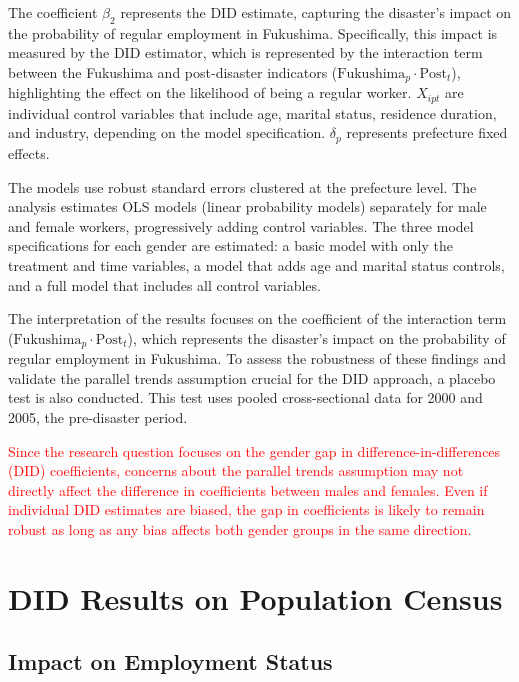 \documentclass[a4paper,12pt]{article}
\begin{document}
The coefficient $\beta_2$ represents the DID estimate, capturing the disaster's impact on the probability of regular employment in Fukushima. Specifically, this impact is measured by the DID estimator, which is represented by the interaction term between the Fukushima and post-disaster indicators ($\text{Fukushima}_p \cdot \text{Post}_t$), highlighting the effect on the likelihood of being a regular worker. $X_{ipt}$ are individual control variables that include age, marital status, residence duration, and industry, depending on the model specification. $\delta_p$ represents prefecture fixed effects.

The models use robust standard errors clustered at the prefecture level. The analysis estimates OLS models (linear probability models) separately for male and female workers, progressively adding control variables. The three model specifications for each gender are estimated: a basic model with only the treatment and time variables, a model that adds age and marital status controls, and a full model that includes all control variables.

The interpretation of the results focuses on the coefficient of the interaction term ($\text{Fukushima}_p \cdot \text{Post}_t$), which represents the disaster's impact on the probability of regular employment in Fukushima. To assess the robustness of these findings and validate the parallel trends assumption crucial for the DID approach, a placebo test is also conducted. This test uses pooled cross-sectional data for 2000 and 2005, the pre-disaster period.



\textcolor{red}{Since the research question focuses on the gender gap in difference-in-differences (DID) coefficients, concerns about the parallel trends assumption may not directly affect the difference in coefficients between males and females. Even if individual DID estimates are biased, the gap in coefficients is likely to remain robust as long as any bias affects both gender groups in the same direction.}

\section{DID Results on Population Census}

\subsection{Impact on Employment Status}
\end{document}
